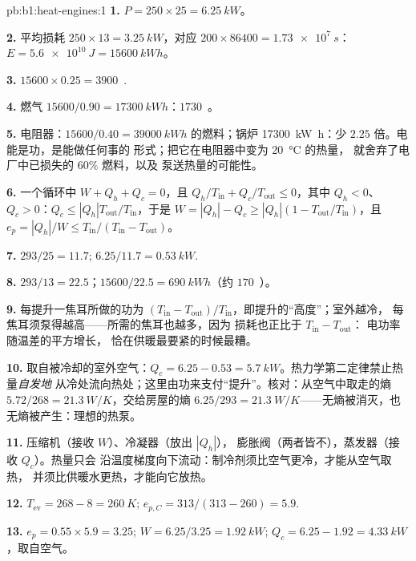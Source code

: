 \begin{solution}{pb:b1:heat-engines:1}
\textbf{1.} $P = 250 \times 25 = \qty{6.25}{kW}$。

\textbf{2.} 平均损耗 $250 \times 13 = \qty{3.25}{kW}$，对应 $200 \times 86400 =
\qty{1.73e7}{s}$：$E = \qty{5.6e10}{J} = \qty{15600}{kW h}$。

\textbf{3.} $15600 \times 0.25 = 3900$~\texteuro.

\textbf{4.} 燃气 $15600/0.90 = \qty{17300}{kW h}$：$1730$~\texteuro。

\textbf{5.} 电阻器：$15600/0.40 = \qty{39000}{kW h}$ 的燃料；锅炉
\qty{17300}{kW h}：少 $2.25$ 倍。电能是功，是能做任何事的
形式；把它在电阻器中变为 \qty{20}{\degreeCelsius} 的热量，
就舍弃了电厂中已损失的 $60\%$ 燃料，以及
泵送热量的可能性。

\textbf{6.} 一个循环中 $W + Q_h + Q_c = 0$，且 $Q_h/T_{\mathrm{in}} +
Q_c/T_{\mathrm{out}} \leq 0$，其中 $Q_h < 0$、$Q_c > 0$：$Q_c \leq
|Q_h|T_{\mathrm{out}}/T_{\mathrm{in}}$，于是 $W = |Q_h| - Q_c \geq |Q_h|(1 -
T_{\mathrm{out}}/T_{\mathrm{in}})$，且 $e_p = |Q_h|/W \leq T_{\mathrm{in}}/(T_{\mathrm{in}} -
T_{\mathrm{out}})$。

\textbf{7.} $293/25 = 11.7$; $6.25/11.7 = \qty{0.53}{kW}$.

\textbf{8.} $293/13 = 22.5$；$15600/22.5 = \qty{690}{kW h}$（约
$170$~\texteuro）。

\textbf{9.} 每提升一焦耳所做的功为 $(T_{\mathrm{in}} - T_{\mathrm{out}})/
T_{\mathrm{in}}$，即提升的“高度”；室外越冷，
每焦耳须泵得越高——所需的焦耳也越多，因为
损耗也正比于 $T_{\mathrm{in}} - T_{\mathrm{out}}$：
电功率随温差的平方增长，
恰在供暖最要紧的时候最糟。

\textbf{10.} 取自被冷却的室外空气：$Q_c = 6.25 - 0.53 =
\qty{5.7}{kW}$。热力学第二定律禁止热量\emph{自发地}
从冷处流向热处；这里由功来支付“提升”。核对：从空气中取走的熵
$5.72/268 = \qty{21.3}{W/K}$，交给房屋的熵 $6.25/293 =
\qty{21.3}{W/K}$——无熵被消灭，也无熵被产生：理想的热泵。

\textbf{11.} 压缩机（接收 $W$）、冷凝器（放出 $|Q_h|$），
膨胀阀（两者皆不），蒸发器（接收 $Q_c$）。热量只会
沿温度梯度向下流动：制冷剂须比空气更冷，才能从空气取热，
并须比供暖水更热，才能向它放热。

\textbf{12.} $T_{\mathrm{ev}} = 268 - 8 = \qty{260}{K}$; $e_{p,C} = 313/(313 - 260)
= 5.9$.

\textbf{13.} $e_p = 0.55 \times 5.9 = 3.25$; $W = 6.25/3.25 = \qty{1.92}{kW}$;
$Q_c = 6.25 - 1.92 = \qty{4.33}{kW}$，取自空气。


\end{solution}
